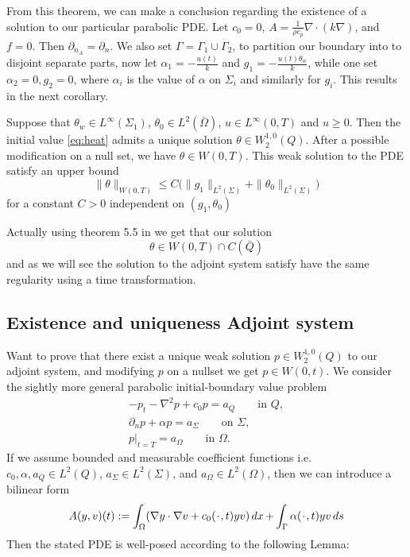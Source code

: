 From this theorem, we can make a conclusion regarding the existence of a solution to our particular parabolic PDE. Let $c_0 = 0$, $A = \frac{1}{\rho c_p}\nabla \cdot (k\nabla)$, and $f = 0$. Then $\partial_{n_A} = \partial_n$. We also set $\Gamma = \Gamma_1 \cup \Gamma_2$, to partition our boundary into to disjoint separate parts, now let $\alpha_1 = -\frac{u(t)}{k}$ and $g_1 = -\frac{u(t)\theta_w}{k}$, while one set $\alpha_2 = 0, g_2 = 0$, where $\alpha_i$ is the value of $\alpha$ on $\Sigma_i$ and similarly for $g_i$. This results in the next corollary. 

\begin{corollary}[Existence]
Suppose that $\theta_w \in L^{\infty}(\Sigma_1)$, $\theta_0 \in L^2(\bar{\Omega})$, $u \in L^{\infty}(0,T)$ and $u\geq 0$. Then the initial value \eqref{eq:heat} admits a unique solution $\theta \in W_2^{1,0}(Q)$. After a possible modification on a null set, we have $\theta \in W(0,T)$. This weak solution to the PDE satisfy an upper bound 
\begin{equation*}
    \|\theta \|_{W(0,T)} \leq C\bigg ( \|g_1\|_{L^2(\Sigma)} + \|\theta_0\|_{L^2(\Sigma)} \bigg )
\end{equation*}
for a constant $C>0$ independent on $(g_1, \theta_0)$
\end{corollary}

Actually using theorem 5.5 in \cite{optimalControl} we get that our solution 
\begin{equation*}
    \theta \in W(0,T) \cap C (\bar{Q})
\end{equation*}
and as we will see the solution to the adjoint system satisfy have the same regularity using a time transformation. 


\subsection{Existence and uniqueness Adjoint system}
Want to prove that there exist a unique weak solution $p \in W_2^{1,0}(Q)$ to our adjoint system, and modifying $p$ on a nullset we get $p\in W(0,t)$. We consider the sightly more general parabolic initial-boundary value problem 
\begin{align*}
    -p_t -\nabla^2p +c_0p = a_Q \qquad \text{in } Q, \\
    \partial_np + \alpha p = a_{\Sigma} \qquad \text{on } \Sigma, \\
    p|_{t=T} = a_{\Omega} \qquad \text{in } \Omega.
\end{align*}
If we assume bounded and measurable coefficient functions i.e. $c_0, \alpha, a_Q \in L^2(Q)$, $a_{\Sigma} \in L^2(\Sigma)$, and $a_{\Omega} \in L^2(\Omega)$, then we can introduce a bilinear form
\begin{equation}
    \label{eq:parabolic_adj}
    A(y,v)(t) := \int_{\Omega}(\nabla y \cdot \nabla v + c_0(\placeholder,t) y v) \dx + \int_{\Gamma}\alpha(\placeholder,t) y v \ds
\end{equation}
Then the stated PDE is well-posed according to the following Lemma:

